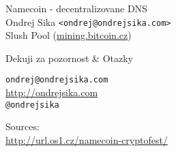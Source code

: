\documentclass{beamer}
\begin{document}
\begin{frame}

    {\huge Namecoin - decentralizovane DNS}\\
    \vspace{7mm}
    {\LARGE Ondrej Sika \lstinline|<ondrej@ondrejsika.com>|}\\
    \vspace{7mm}
    {\Large Slush Pool (\url{mining.bitcoin.cz})}\\

\end{frame}

\begin{frame}

    {\huge Dekuji za pozornost \& Otazky}\\

    \vspace{1cm}

    \texttt{ondrej@ondrejsika.com}\\
    \url{http://ondrejsika.com}\\
    \texttt{@ondrejsika}\\

    \vspace{1cm}

    Sources:\\
    \url{http://url.os1.cz/namecoin-cryptofest/}
\end{frame}
\end{document}
